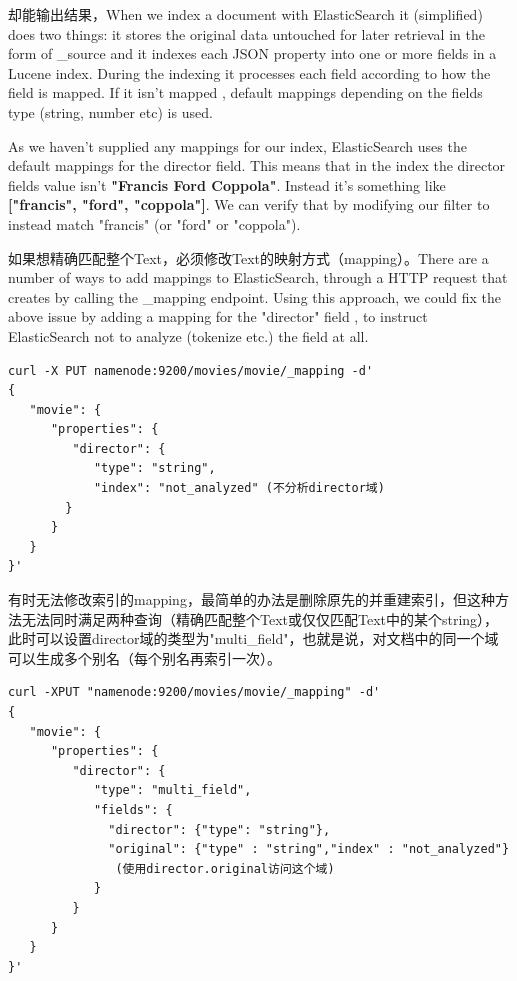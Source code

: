 \par 却能输出结果，When we index a document with ElasticSearch it (simplified) does two things: it stores the original data untouched for later retrieval in the form of \_source and it indexes each JSON property into one or more fields in a Lucene index. During the indexing it processes each field according to how the field is mapped. If it isn't mapped , default mappings depending on the fields type (string, number etc) is used.
\par As we haven't supplied any mappings for our index, ElasticSearch uses the default mappings for the director field. This means that in the index the director fields value isn't \textbf{"Francis Ford Coppola"}. Instead it's something like \textbf{["francis", "ford", "coppola"]}. We can verify that by modifying our filter to instead match "francis" (or "ford" or "coppola").
\par 如果想精确匹配整个Text，必须修改Text的映射方式（mapping）。There are a number of ways to add mappings to ElasticSearch, through a HTTP request that creates by calling the \_mapping endpoint. Using this approach, we could fix the above issue by adding a mapping for the "director" field , to instruct ElasticSearch not to analyze (tokenize etc.) the field at all.
\begin{verbatim}
curl -X PUT namenode:9200/movies/movie/_mapping -d'
{
   "movie": {
      "properties": {
         "director": {
            "type": "string",
            "index": "not_analyzed" (不分析director域)
        }
      }
   }
}'
\end{verbatim}
\par 有时无法修改索引的mapping，最简单的办法是删除原先的并重建索引，但这种方法无法同时满足两种查询（精确匹配整个Text或仅仅匹配Text中的某个string），此时可以设置director域的类型为"multi\_field"，也就是说，对文档中的同一个域可以生成多个别名（每个别名再索引一次）。
\begin{verbatim}
curl -XPUT "namenode:9200/movies/movie/_mapping" -d'
{
   "movie": {
      "properties": {
         "director": {
            "type": "multi_field",
            "fields": {
              "director": {"type": "string"},
              "original": {"type" : "string","index" : "not_analyzed"}
               (使用director.original访问这个域)
            }
         }
      }
   }
}'
\end{verbatim}

